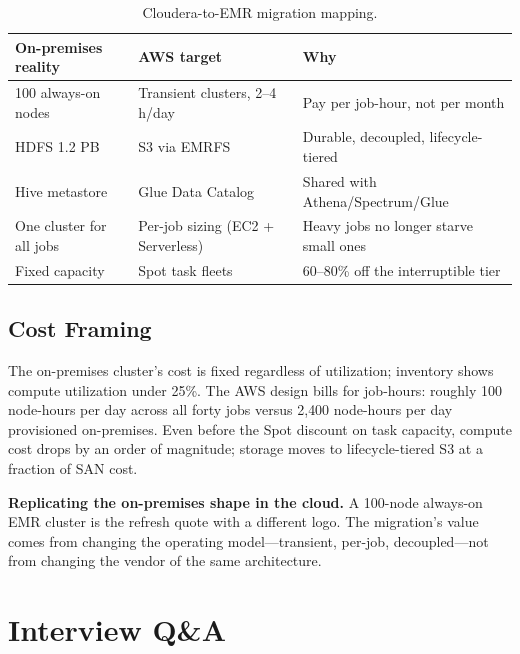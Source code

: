 \begin{table}[H]
\centering
\small
\begin{tabular}{@{}p{4.2cm}p{4.4cm}p{4.4cm}@{}}
\toprule
\textbf{On-premises reality} & \textbf{AWS target} & \textbf{Why} \\
\midrule
100 always-on nodes & Transient clusters, 2--4 h/day & Pay per job-hour, not per month \\
HDFS 1.2 PB & S3 via EMRFS & Durable, decoupled, lifecycle-tiered \\
Hive metastore & Glue Data Catalog & Shared with Athena/Spectrum/Glue \\
One cluster for all jobs & Per-job sizing (EC2 + Serverless) & Heavy jobs no longer starve small ones \\
Fixed capacity & Spot task fleets & 60--80\% off the interruptible tier \\
\bottomrule
\end{tabular}
\caption{Cloudera-to-EMR migration mapping.}
\label{tab:ch9-migration}
\end{table}

\subsection{Cost Framing}
The on-premises cluster's cost is fixed regardless of utilization; inventory shows compute utilization under 25\%. The AWS design bills for job-hours: roughly 100 node-hours per day across all forty jobs versus 2{,}400 node-hours per day provisioned on-premises. Even before the Spot discount on task capacity, compute cost drops by an order of magnitude; storage moves to lifecycle-tiered S3 at a fraction of SAN cost.

\begin{pitfall}
\textbf{Replicating the on-premises shape in the cloud.} A 100-node always-on EMR cluster is the refresh quote with a different logo. The migration's value comes from changing the operating model---transient, per-job, decoupled---not from changing the vendor of the same architecture.
\end{pitfall}

\section{Interview Q\&A}
